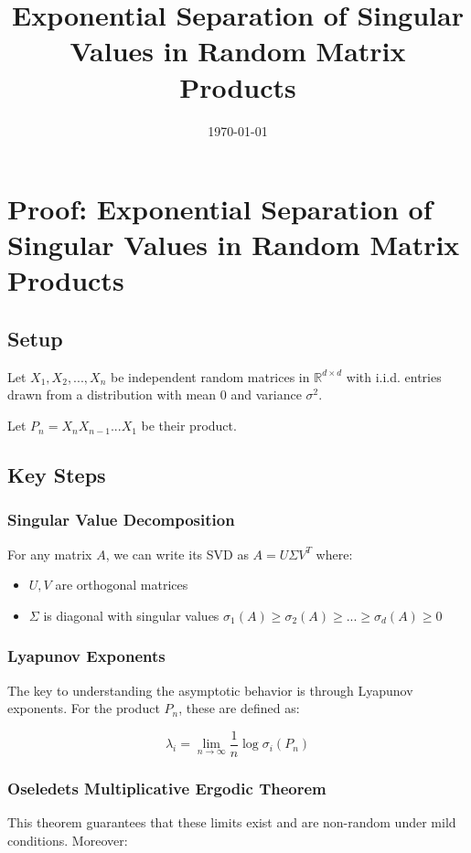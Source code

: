 \documentclass[12pt]{article}
\title{Exponential Separation of Singular Values in Random Matrix Products}
\author{}
\date{\today}
\theoremstyle{plain}
\theoremstyle{definition}
\theoremstyle{remark}
\begin{document}
\maketitle

\section{Proof: Exponential Separation of Singular Values in Random Matrix Products}

\subsection{Setup}
Let $X_1, X_2, ..., X_n$ be independent random matrices in $\mathbb{R}^{d \times d}$ with i.i.d. entries drawn from a distribution with mean 0 and variance $\sigma^2$.

Let $P_n = X_n X_{n-1} ... X_1$ be their product.

\subsection{Key Steps}

\subsubsection{Singular Value Decomposition}
For any matrix $A$, we can write its SVD as $A = U\Sigma V^T$ where:
\begin{itemize}
    \item $U, V$ are orthogonal matrices
    \item $\Sigma$ is diagonal with singular values $\sigma_1(A) \geq \sigma_2(A) \geq ... \geq \sigma_d(A) \geq 0$
\end{itemize}

\subsubsection{Lyapunov Exponents}
The key to understanding the asymptotic behavior is through Lyapunov exponents. For the product $P_n$, these are defined as:

\[
\lambda_i = \lim_{n \to \infty} \frac{1}{n} \log \sigma_i(P_n)
\]

\subsubsection{Oseledets Multiplicative Ergodic Theorem}
This theorem guarantees that these limits exist and are non-random under mild conditions. Moreover:
\end{document}
